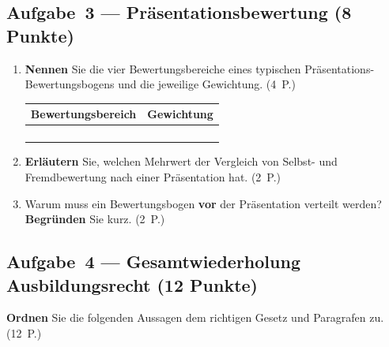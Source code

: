 \documentclass[11pt, a4paper]{article}
\begin{document}
\subsection*{Aufgabe~3 --- Präsentationsbewertung (8 Punkte)}

\begin{enumerate}[label=(\alph*)]
  \item \textbf{Nennen} Sie die vier Bewertungsbereiche eines typischen
  Präsentations-Bewertungsbogens und die jeweilige Gewichtung. \hfill (4~P.)

  \bigskip

  \noindent
  \begin{tabular}{|p{7cm}|p{5.5cm}|}
  \hline
  \textbf{Bewertungsbereich} & \textbf{Gewichtung}\\
  \hline
  & \\[0.8cm]
  \hline
  & \\[0.8cm]
  \hline
  & \\[0.8cm]
  \hline
  & \\[0.8cm]
  \hline
  \end{tabular}

  \bigskip

  \item \textbf{Erläutern} Sie, welchen Mehrwert der Vergleich von Selbst- und Fremdbewertung
  nach einer Präsentation hat. \hfill (2~P.)

  \vspace{4cm}

  \item Warum muss ein Bewertungsbogen \textbf{vor} der Präsentation verteilt werden?
  \textbf{Begründen} Sie kurz. \hfill (2~P.)

  \vspace{3.5cm}
\end{enumerate}

\subsection*{Aufgabe~4 --- Gesamtwiederholung Ausbildungsrecht (12 Punkte)}

\textbf{Ordnen} Sie die folgenden Aussagen dem richtigen Gesetz und Paragrafen zu. \hfill (12~P.)

\bigskip
\end{document}
